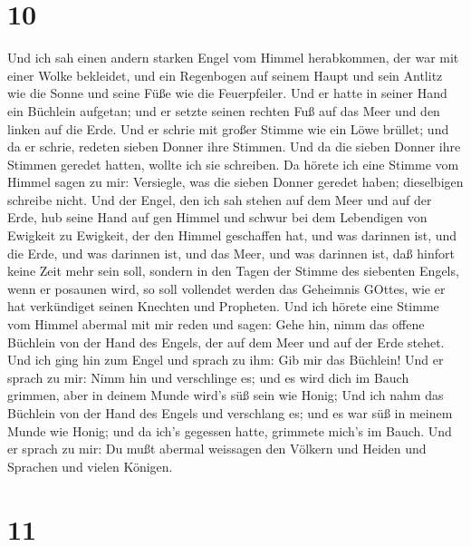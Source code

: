 \hypertarget{section-8}{%
\section{10}\label{section-8}}

 Und ich sah einen andern starken Engel vom Himmel
herabkommen, der war mit einer Wolke bekleidet, und ein Regenbogen auf
seinem Haupt und sein Antlitz wie die Sonne und seine Füße wie die
Feuerpfeiler.  Und er hatte in seiner Hand ein Büchlein
aufgetan; und er setzte seinen rechten Fuß auf das Meer und den linken
auf die Erde.  Und er schrie mit großer Stimme wie ein Löwe
brüllet; und da er schrie, redeten sieben Donner ihre Stimmen.
 Und da die sieben Donner ihre Stimmen geredet hatten,
wollte ich sie schreiben. Da hörete ich eine Stimme vom Himmel sagen zu
mir: Versiegle, was die sieben Donner geredet haben; dieselbigen
schreibe nicht.  Und der Engel, den ich sah stehen auf dem
Meer und auf der Erde, hub seine Hand auf gen Himmel  und
schwur bei dem Lebendigen von Ewigkeit zu Ewigkeit, der den Himmel
geschaffen hat, und was darinnen ist, und die Erde, und was darinnen
ist, und das Meer, und was darinnen ist, daß hinfort keine Zeit mehr
sein soll,  sondern in den Tagen der Stimme des siebenten
Engels, wenn er posaunen wird, so soll vollendet werden das Geheimnis
GOttes, wie er hat verkündiget seinen Knechten und Propheten.
 Und ich hörete eine Stimme vom Himmel abermal mit mir reden
und sagen: Gehe hin, nimm das offene Büchlein von der Hand des Engels,
der auf dem Meer und auf der Erde stehet.  Und ich ging hin
zum Engel und sprach zu ihm: Gib mir das Büchlein! Und er sprach zu mir:
Nimm hin und verschlinge es; und es wird dich im Bauch grimmen, aber in
deinem Munde wird's süß sein wie Honig;  Und ich nahm das
Büchlein von der Hand des Engels und verschlang es; und es war süß in
meinem Munde wie Honig; und da ich's gegessen hatte, grimmete mich's im
Bauch.  Und er sprach zu mir: Du mußt abermal weissagen den
Völkern und Heiden und Sprachen und vielen Königen.

\hypertarget{section-9}{%
\section{11}\label{section-9}}

